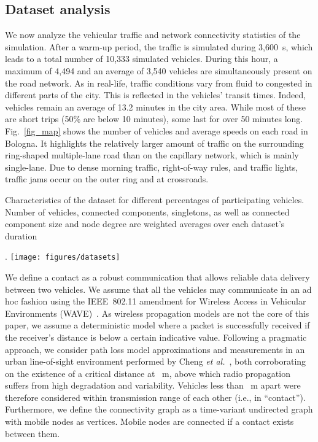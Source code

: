 \documentclass[preprint]{elsarticle}
\begin{document}
\subsection{Dataset analysis}
\label{subsec:dataset_analysis}

We now analyze the vehicular traffic and network connectivity statistics of the simulation. After a warm-up period, the traffic is simulated during 3,600~s, which leads to a total number of 10,333 simulated vehicles. During this hour, a maximum of 4,494 and an average of 3,540 vehicles are simultaneously present on the road network. As in real-life, traffic conditions vary from fluid to congested in different parts of the city. This is reflected in the vehicles' transit times. Indeed, vehicles remain an average of 13.2 minutes in the city area. While most of these are short trips (50\% are below 10 minutes), some last for over 50 minutes long. Fig.~\ref{fig_map} shows the number of vehicles and average speeds on each road in Bologna. It highlights the relatively larger amount of traffic on the surrounding ring-shaped multiple-lane road than on the capillary network, which is mainly single-lane. Due to dense morning traffic, right-of-way rules, and traffic lights, traffic jams occur on the outer ring and at crossroads.

\begin{table}
  \centering
  \caption{Characteristics of the dataset for different percentages of participating vehicles. Number of vehicles, connected components, singletons, as well as connected component size and node degree are weighted averages over each dataset's duration}.
  \texttt{[image: figures/datasets]}
  \label{table:dataset}
\end{table}

We define a contact as a robust communication that allows reliable data delivery between two vehicles. We assume that all the vehicles may communicate in an ad hoc fashion using the IEEE~802.11 amendment for Wireless Access in Vehicular Environments (WAVE)~\cite{80211p}. As wireless propagation models are not the core of this paper, we assume a deterministic model where a packet is successfully received if the receiver's distance is below a certain indicative value. Following a pragmatic approach, we consider path loss model approximations and measurements in an urban line-of-sight environment performed by Cheng \textit{et al.}~\cite{cheng2007mobile}, both corroborating on the existence of a critical distance at ~m, above which radio propagation suffers from high degradation and variability. Vehicles less than ~m apart were therefore considered within transmission range of each other (i.e., in ``contact''). Furthermore, we define the connectivity graph as a time-variant undirected graph with mobile nodes as vertices. Mobile nodes are connected if a contact exists between them.
\end{document}
